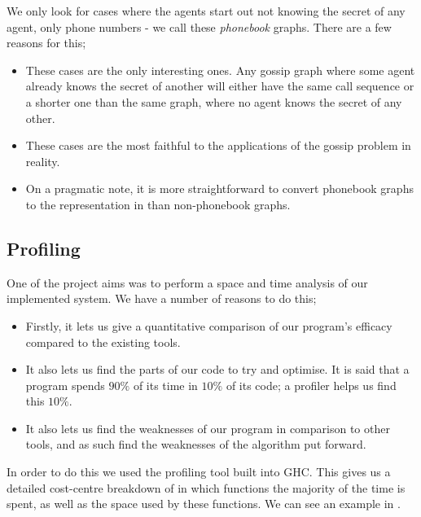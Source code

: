 \documentclass[12pt, a4paper]{article}
\begin{document}
We only look for cases where the agents start out not knowing the secret 
of any agent, only phone numbers - we call these \textit{phonebook} graphs.
There are a few reasons for this;

\begin{itemize}
\item These cases are the only interesting ones. Any gossip graph where some
  agent already knows the secret of another will either have the same call
  sequence or a shorter one than the same graph, where no agent knows the secret
  of any other.
\item These cases are the most faithful to the applications of the gossip
  problem in reality.
\item On a pragmatic note, it is more straightforward to convert phonebook
  graphs to the representation in \cite{GithubGossip} than non-phonebook graphs.
\end{itemize}

\subsection{Profiling}

One of the project aims was to perform a space and time analysis of our
implemented system. We have a number of reasons to do this;

\begin{itemize}
\item Firstly, it lets us give a quantitative comparison of our program's
  efficacy compared to the existing tools.
\item It also lets us find the parts of our code to try and optimise. It is said
  that a program spends $90\%$ of its time in $10\%$ of its code; a profiler helps
  us find this $10\%$.
\item It also lets us find the weaknesses of our program in comparison to other
  tools, and as such find the weaknesses of the algorithm put forward. 
\end{itemize}

In order to do this we used the profiling tool built into GHC. This gives us a
detailed cost-centre breakdown of in which functions the majority of the time is
spent, as well as the space used by these functions. We can see an example in
.
\end{document}
